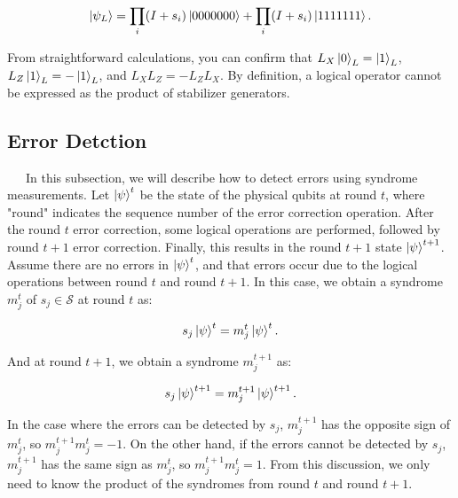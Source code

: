 \documentclass[a4paper,11pt]{ltjsarticle}
\begin{document}
{{{            \begin{align*}
                \ket{\psi_L}=\prod_{i}(I+s_i)\ket{0000000}+\prod_{i}(I+s_i)\ket{1111111}.
            \end{align*}

            From straightforward calculations, you can confirm that $L_X\ket{0}_L = \ket{1}_L$, $L_Z\ket{1}_L = -\ket{1}_L$, and $L_XL_Z = -L_ZL_X$. By definition, a logical operator cannot be expressed as the product of stabilizer generators.
        }

        \subsection{Error Detction}{
            \ \ \ In this subsection, we will describe how to detect errors using syndrome measurements. Let $\ket{\psi}^t$ be the state of the physical qubits at round $t$, where "round" indicates the sequence number of the error correction operation. After the round $t$ error correction, some logical operations are performed, followed by round $t+1$ error correction. Finally, this results in the round $t+1$ state $\ket{\psi}^{t+1}$. Assume there are no errors in $\ket{\psi}^t$, and that errors occur due to the logical operations between round $t$ and round $t+1$. In this case, we obtain a syndrome $m^t_j$ of $s_j \in \mathcal{S}$ at round $t$ as:
            
            \begin{align*}
                s_j\ket{\psi}^t=m_j^t\ket{\psi}^t.
            \end{align*}

            And at round $t+1$, we obtain a syndrome $m^{t+1}_j$ as:

            \begin{align*}
                s_j\ket{\psi}^{t+1}=m_j^{t+1}\ket{\psi}^{t+1}.
            \end{align*}

            In the case where the errors can be detected by $s_j$, $m_j^{t+1}$ has the opposite sign of $m_j^t$, so $m_j^{t+1}m_j^t = -1$. On the other hand, if the errors cannot be detected by $s_j$, $m_j^{t+1}$ has the same sign as $m_j^t$, so $m_j^{t+1}m_j^t = 1$. From this discussion, we only need to know the product of the syndromes from round $t$ and round $t+1$.


        }
        



    }
}
\end{document}
